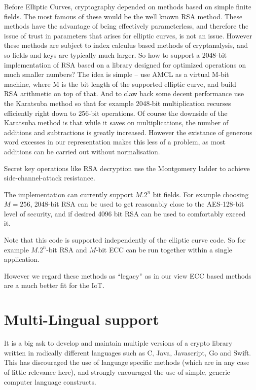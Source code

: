 \documentclass{llncs}
\begin{document}
Before Elliptic Curves, cryptography depended on methods based on simple finite fields. The most famous of these would be the well known RSA method. These methods have the advantage of
being effectively parameterless, and therefore the issue of trust in parameters that arises for elliptic curves, is not an issue. However these methods are subject to index calculus based
methods of cryptanalysis, and so fields and keys are typically much larger. So how to support a 2048-bit implementation of RSA based on a library designed for optimized operations on much smaller numbers? 
The idea is simple --
use AMCL as a virtual M-bit machine, where M is the bit length of the supported elliptic curve, and build RSA arithmetic on top of that. And to claw back some decent performance use the Karatsuba 
method \cite{knuth} so that for example 2048-bit multiplication
recurses efficiently right down to 256-bit operations. Of course the downside of the Karatsuba method is that while it saves on multiplications, the number of additions and subtractions is greatly increased.
However the existance of generous word excesses in our representation makes this less of a problem, as most additions can be carried out without normalisation. 

Secret key operations like RSA decryption use the Montgomery ladder to achieve side-channel-attack resistance.

The implementation can currently support $M.2^n$ bit fields. For example choosing $M=256$, 2048-bit RSA can be used to get reasonably close to the AES-128-bit level of security, and if desired 4096 bit RSA can be used to
comfortably exceed it. 

Note that this code is supported independently of the elliptic curve code. So for example $M.2^n$-bit RSA and $M$-bit ECC can be run together within a single application. 

However we regard these methods as ``legacy'' as in our view ECC based methods are a much better fit for the IoT. 

\section{Multi-Lingual support}

It is a big ask to develop and maintain multiple versions of a crypto library written in radically different languages such as C, Java, Javascript, Go and Swift. This has discouraged the use of
language specific methods (which are in any case of little relevance here), and strongly encouraged the use of simple, generic computer language constructs. 
\end{document}

